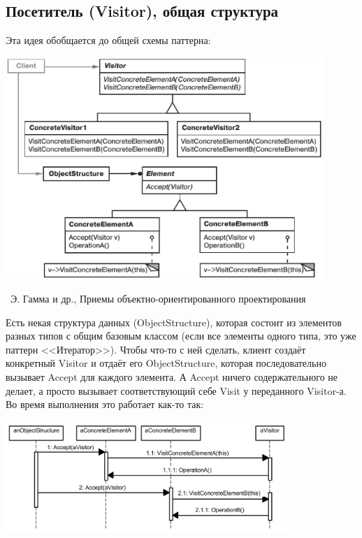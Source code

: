 \documentclass[a5paper]{article}
\newcommand{\attribution}[1] {
    \vspace{-5mm}\begin{flushright}\begin{scriptsize}%
    {\textcopyright\, #1}\end{scriptsize}\end{flushright}
}
\begin{document}
\subsection{Посетитель (Visitor), общая структура}

Эта идея обобщается до общей схемы паттерна:

\begin{center}
    \includegraphics[width=0.9\textwidth]{visitor.png}
    \attribution{Э. Гамма и др., Приемы объектно-ориентированного проектирования}
\end{center}

Есть некая структура данных (ObjectStructure), которая состоит из элементов разных типов с общим базовым классом (если все элементы одного типа, это уже паттерн <<Итератор>>). Чтобы что-то с ней сделать, клиент создаёт конкретный Visitor и отдаёт его ObjectStructure, которая последовательно вызывает Accept для каждого элемента. А Accept ничего содержательного не делает, а просто вызывает соответствующий себе Visit у переданного Visitor-а. Во время выполнения это работает как-то так:

\begin{center}
    \includegraphics[width=0.8\textwidth]{doubleDispatching.png}
\end{center}
\end{document}
